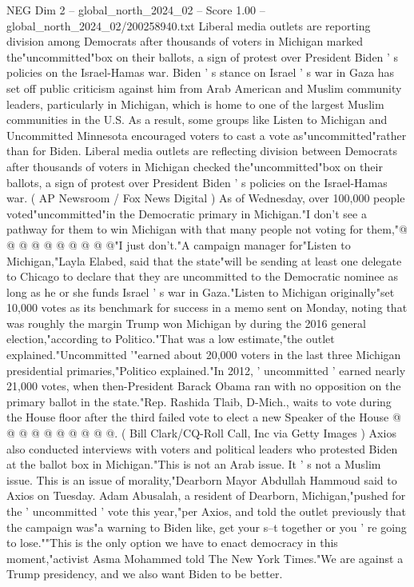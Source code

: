 \begin{textsample}{NEG Dim 2 – global\_north\_2024\_02 – Score 1.00 – global\_north\_2024\_02/200258940.txt}  \label{ex:f2_neg_299}
Liberal media outlets are reporting division among Democrats after thousands of voters in Michigan marked the"uncommitted"box on their ballots, a sign of protest over President Biden ' s policies on the Israel-Hamas war.
Biden ' s stance on Israel ' s war in Gaza has set off public criticism against him from Arab American and Muslim community leaders, particularly in Michigan, which is home to one of the largest Muslim communities in the U.S.
As a result, some groups like Listen to Michigan and Uncommitted Minnesota encouraged voters to cast a vote as"uncommitted"rather than for Biden.
Liberal media outlets are reflecting division between Democrats after thousands of voters in Michigan checked the"uncommitted"box on their ballots, a sign of protest over President Biden ' s policies on the Israel-Hamas war. ( AP Newsroom / Fox News Digital ) As of Wednesday, over 100,000 people voted"uncommitted"in the Democratic primary in Michigan."I don't see a pathway for them to win Michigan with that many people not voting for them,"@ @ @ @ @ @ @ @ @ @"I just don't."A campaign manager for"Listen to Michigan,"Layla Elabed, said that the state"will be sending at least one delegate to Chicago to declare that they are uncommitted to the Democratic nominee as long as he or she funds Israel ' s war in Gaza."Listen to Michigan originally"set 10,000 votes as its benchmark for success in a memo sent on Monday, noting that was roughly the margin Trump won Michigan by during the 2016 general election,"according to Politico."That was a low estimate,"the outlet explained."Uncommitted '"earned about 20,000 voters in the last three Michigan presidential primaries,"Politico explained."In 2012, ' uncommitted ' earned nearly 21,000 votes, when then-President Barack Obama ran with no opposition on the primary ballot in the state."Rep.
Rashida Tlaib, D-Mich., waits to vote during the House floor after the third failed vote to elect a new Speaker of the House @ @ @ @ @ @ @ @ @ @. ( Bill Clark/CQ-Roll Call, Inc via Getty Images ) Axios also conducted interviews with voters and political leaders who protested Biden at the ballot box in Michigan."This is not an Arab issue.
It ' s not a Muslim issue.
This is an issue of morality,"Dearborn Mayor Abdullah Hammoud said to Axios on Tuesday.
Adam Abusalah, a resident of Dearborn, Michigan,"pushed for the ' uncommitted ' vote this year,"per Axios, and told the outlet previously that the campaign was"a warning to Biden like, get your s--t together or you ' re going to lose.""This is the only option we have to enact democracy in this moment,"activist Asma Mohammed told The New York Times."We are against a Trump presidency, and we also want Biden to be better.

\end{textsample}
